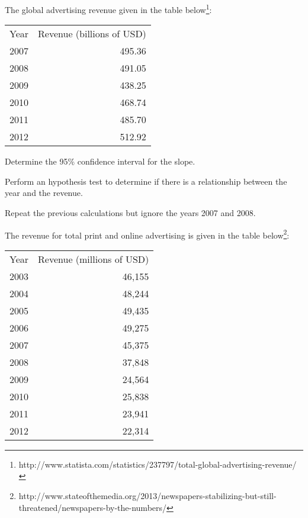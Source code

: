 
\begin{problem}
\item The global advertising revenue given in the table
  below\footnote{http://www.statista.com/statistics/237797/total-global-advertising-revenue/}:  \\
  \begin{tabular}{rr}
    Year & Revenue (billions of USD) \\
    2007 & 495.36 \\
    2008 & 491.05 \\
    2009 & 438.25 \\
    2010 & 468.74 \\
    2011 & 485.70 \\
    2012 & 512.92
  \end{tabular}

  \begin{subproblem}
    \item Determine the 95\% confidence interval for the slope.
      \vfill
    \item Perform an hypothesis test to determine if there is a
      relationship between the year and the revenue.
      \vfill
    \item Repeat the previous calculations but ignore the years 2007 and 2008.
      \vfill
  \end{subproblem}

  \clearpage

\item The revenue for total print and online advertising is given in
  the table
  below\footnote{http://www.stateofthemedia.org/2013/newspapers-stabilizing-but-still-threatened/newspapers-by-the-numbers/}: \\
  \begin{tabular}{rr}
    Year & Revenue (millions of USD) \\
    2003 & 46,155 \\
    2004 & 48,244 \\
    2005 & 49,435 \\
    2006 & 49,275 \\
    2007 & 45,375 \\
    2008 & 37,848 \\
    2009 & 24,564 \\
    2010 & 25,838 \\
    2011 & 23,941 \\
    2012 & 22,314
  \end{tabular}


\end{problem}
